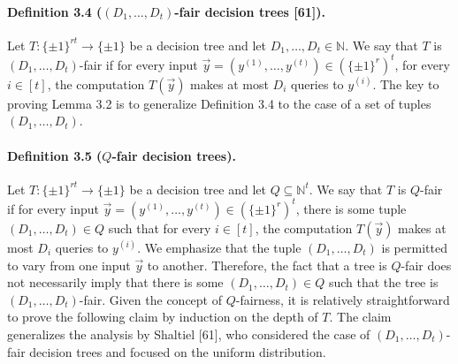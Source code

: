 \paragraph{Definition 3.4 ($(D_1,\ldots,D_t)$-fair decision trees [61]).} Let $T:\{\pm1\}^{rt}\to\{\pm1\}$ be a decision tree and let $D_1,\ldots,D_t\in\mathbb N$. We say that $T$ is $(D_1,\ldots,D_t)$-fair if for every input $\vec y=(y^{(1)},\ldots,y^{(t)})\in(\{\pm1\}^r)^t$, for every $i\in[t]$, the computation $T(\vec y)$ makes at most $D_i$ queries to $y^{(i)}$.
The key to proving Lemma 3.2 is to generalize Definition 3.4 to the case of a set of tuples $(D_1,\ldots,D_t)$.
\paragraph{Definition 3.5 ($Q$-fair decision trees).} Let $T:\{\pm1\}^{rt}\to\{\pm1\}$ be a decision tree and let $Q\subseteq\mathbb N^t$. We say that $T$ is $Q$-fair if for every input $\vec y=(y^{(1)},\ldots,y^{(t)})\in(\{\pm1\}^r)^t$, there is some tuple $(D_1,\ldots,D_t)\in Q$ such that for every $i\in[t]$, the computation $T(\vec y)$ makes at most $D_i$ queries to $y^{(i)}$.
We emphasize that the tuple $(D_1,\ldots,D_t)$ is permitted to vary from one input $\vec y$ to another. Therefore, the fact that a tree is $Q$-fair does not necessarily imply that there is some $(D_1,\ldots,D_t)\in Q$ such that the tree is $(D_1,\ldots,D_t)$-fair. Given the concept of $Q$-fairness, it is relatively straightforward to prove the following claim by induction on the depth of $T$. The claim generalizes the analysis by Shaltiel [61], who considered the case of $(D_1,\ldots,D_t)$-fair decision trees and focused on the uniform distribution.

